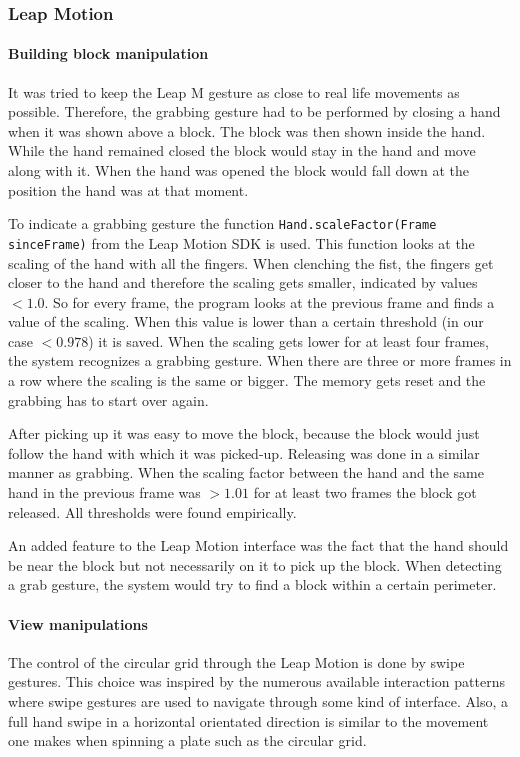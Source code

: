 \subsubsection{Leap Motion}

\paragraph{Building block manipulation}
It was tried to keep the Leap M gesture as close to real life movements as possible. Therefore, the grabbing gesture had to be performed by closing a hand when it was 
shown above a block. The block was then shown inside the hand. While the hand remained closed the block would stay in the hand and move along with it. When the hand was opened 
the block would fall down at the position the hand was at that moment.

To indicate a grabbing gesture the function \texttt{Hand.scaleFactor(Frame sinceFrame)} from the Leap Motion SDK is used. This function looks at the scaling of the hand with 
all the fingers. When clenching the fist, the fingers get closer to the hand and therefore the scaling gets smaller, indicated by values $<1.0$. So for every frame, the program 
looks at the previous frame and finds a value of the scaling. When this value is lower than a certain threshold (in our case $<0.978$) it is saved. When the scaling gets lower 
for at least four frames, the system recognizes a grabbing gesture. When there are three or more frames in a row where the scaling is the same or bigger. The memory
 gets reset and the grabbing has to start over again.

After picking up it was easy to move the block, because the block would just follow the hand with which it was picked-up. Releasing was done in a similar manner as grabbing. 
When the scaling factor between the hand and the same hand in the previous frame was $>1.01$ for at least two frames the block got released. All thresholds were found
 empirically.

An added feature to the Leap Motion interface was the fact that the hand should be near the block but not necessarily  on it to pick up the block. When detecting a grab gesture, 
the system would try to find a block within a certain perimeter.

\paragraph{View manipulations}
The control of the circular grid through the Leap Motion is done by
swipe gestures. This choice was inspired by the numerous available
interaction patterns where swipe gestures are used to navigate through
some kind of interface. Also, a full hand swipe in a horizontal orientated
direction is similar to the movement one makes when spinning a plate
such as the circular grid. 

